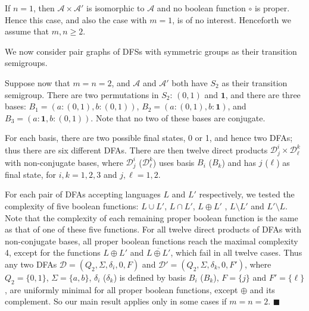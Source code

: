 \documentclass{llncs}
\newcommand{\ol}{\overline}
\newcommand{\Sig}{\Sigma}
\newcommand{\cA}{{\mathcal A}}
\newcommand{\cD}{{\mathcal D}}
\newcommand{\one}{{\mathbf 1}}
\newcommand{\qedb}{\hfill$\blacksquare$}
\begin{document}
If $n=1$,  then $\cA\times\cA'$ is isomorphic to $\cA$ and  no
boolean function $\circ$ is proper.
Hence this case, and also the case with $m=1$, is of no interest.
Henceforth we assume that  $m,n\ge 2$.

We now consider  pair graphs of DFSs with symmetric groups as their transition semigroups.  

\begin{example}
\label{ex:22}
Suppose now that $m=n=2$, and $\cA$ and $\cA'$ both have $S_2$ as their transition semigroup.
There are two permutations in $S_2$: $(0,1)$ and $\one$, and 
there are  three bases:  $B_1=(a\colon (0,1), b\colon (0,1))$,
$B_2=(a\colon (0,1), b\colon \one)$, and
$B_3=(a\colon \one, b\colon (0,1))$.
Note that no two of these bases are conjugate.

For each basis, there are two possible final states, 0 or 1, and  hence  two DFAs; thus there are six different DFAs.
There are then twelve direct products $\cD^i_j\times \cD^k_\ell$ with non-conjugate bases, where
$\cD^i_j$ ($\cD^k_\ell$) uses basis $B_i$ ($B_k$) and has $j$ ($\ell$) as final state, for $i,k=1,2,3$ and $j,\ell=1,2$.

For each pair of DFAs accepting languages $L$ and $L'$ respectively, we tested the complexity of five boolean functions: 
$L\cup L'$,  $L\cap L'$, $L\oplus L'$ , $L\setminus L'$ and $L'\setminus L$. Note that the complexity of each remaining proper boolean function is the same as that of one of these five functions.
For all twelve direct products of DFAs with non-conjugate bases, all proper boolean functions reach the maximal complexity 4, except for the functions $L\oplus L'$ and $\ol{L\oplus L'}$, which fail in all twelve cases.
Thus any two DFAs $\cD=(Q_2,\Sig,\delta_i,0,F)$ and $\cD'=(Q_2,\Sig,\delta_k,0,F')$, where
$Q_2=\{0,1\}$, $\Sig=\{a,b\}$, $\delta_i$ ($\delta_k$) is defined by basis $B_i$ ($B_k$),
$F=\{j\}$ and $F'=\{\ell\}$, are uniformly minimal for all proper boolean functions, except $\oplus$ and its complement. So our main result applies only in some cases if $m=n=2$.
\qedb
\end{example}
\end{document}
